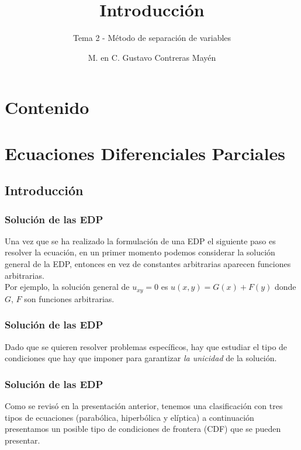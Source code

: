 
\title{\large{Introducción}}
\subtitle{Tema 2 - Método de separación de variables}
\author{M. en C. Gustavo Contreras Mayén}
\date{}

\maketitle
\fontsize{14}{14}\selectfont
{}
\section*{Contenido}
\section{Ecuaciones Diferenciales Parciales}
\subsection{Introducción}
\begin{frame}
\frametitle{Solución de las EDP}
Una vez que se ha realizado la formulación de una EDP el siguiente paso es resolver la ecuación, en un primer momento podemos considerar la solución general de la EDP, entonces en vez de constantes arbitrarias aparecen funciones arbitrarias.
\\
\bigskip
\pause
Por ejemplo, la solución general de $u_{xy} = 0$ es $u(x, y) = G(x) + F (y)$ donde $G$, $F$ son funciones arbitrarias.
\end{frame}
\begin{frame}
\frametitle{Solución de las EDP}
Dado que se quieren resolver problemas específicos, hay que estudiar el tipo de condiciones que hay que imponer para garantizar \emph{la unicidad} de la solución.
\end{frame}
\begin{frame}
\frametitle{Solución de las EDP}
Como se revisó en la presentación anterior, tenemos una clasificación con tres tipos de ecuaciones (parabólica, hiperbólica y elíptica) a continuación presentamos un posible tipo de condiciones de frontera (CDF) que se pueden presentar.
\end{frame}
